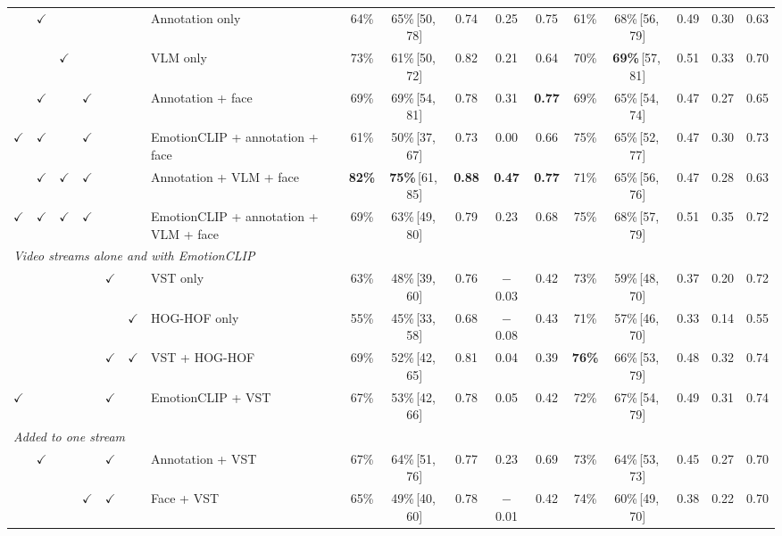 \documentclass[11pt]{article}
\newcommand{\best}[1]{\textbf{#1}}
\newcommand{\ci}[2]{\,[#1,\,#2]}
\begin{document}
\begin{table}[!htbp]
{\begin{tabular}{cccccclcccccccccc}
 & $\checkmark$ &  &  &  &  & Annotation only & 64\% & 65\%\ci{50}{78} & 0.74 & 0.25 & 0.75 & 61\% & 68\%\ci{56}{79} & 0.49 & 0.30 & 0.63 \\
 &  & $\checkmark$ &  &  &  & VLM only & 73\% & 61\%\ci{50}{72} & 0.82 & 0.21 & 0.64 & 70\% & \best{69\%}\ci{57}{81} & 0.51 & 0.33 & 0.70 \\
 & $\checkmark$ &  & $\checkmark$ &  &  & Annotation + face & 69\% & 69\%\ci{54}{81} & 0.78 & 0.31 & \best{0.77} & 69\% & 65\%\ci{54}{74} & 0.47 & 0.27 & 0.65 \\
$\checkmark$ & $\checkmark$ &  & $\checkmark$ &  &  & EmotionCLIP + annotation + face & 61\% & 50\%\ci{37}{67} & 0.73 & 0.00 & 0.66 & 75\% & 65\%\ci{52}{77} & 0.47 & 0.30 & 0.73 \\
 & $\checkmark$ & $\checkmark$ & $\checkmark$ &  &  & Annotation + VLM + face & \best{82\%} & \best{75\%}\ci{61}{85} & \best{0.88} & \best{0.47} & \best{0.77} & 71\% & 65\%\ci{56}{76} & 0.47 & 0.28 & 0.63 \\
$\checkmark$ & $\checkmark$ & $\checkmark$ & $\checkmark$ &  &  & EmotionCLIP + annotation + VLM + face & 69\% & 63\%\ci{49}{80} & 0.79 & 0.23 & 0.68 & 75\% & 68\%\ci{57}{79} & 0.51 & 0.35 & 0.72 \\
\midrule
\multicolumn{17}{l}{\emph{Video streams alone and with EmotionCLIP}} \\
 &  &  &  & $\checkmark$ &  & VST only & 63\% & 48\%\ci{39}{60} & 0.76 & $-$0.03 & 0.42 & 73\% & 59\%\ci{48}{70} & 0.37 & 0.20 & 0.72 \\
 &  &  &  &  & $\checkmark$ & HOG-HOF only & 55\% & 45\%\ci{33}{58} & 0.68 & $-$0.08 & 0.43 & 71\% & 57\%\ci{46}{70} & 0.33 & 0.14 & 0.55 \\
 &  &  &  & $\checkmark$ & $\checkmark$ & VST + HOG-HOF & 69\% & 52\%\ci{42}{65} & 0.81 & 0.04 & 0.39 & \best{76\%} & 66\%\ci{53}{79} & 0.48 & 0.32 & 0.74 \\
$\checkmark$ &  &  &  & $\checkmark$ &  & EmotionCLIP + VST & 67\% & 53\%\ci{42}{66} & 0.78 & 0.05 & 0.42 & 72\% & 67\%\ci{54}{79} & 0.49 & 0.31 & 0.74 \\
\midrule
\multicolumn{17}{l}{\emph{Added to one stream}} \\
 & $\checkmark$ &  &  & $\checkmark$ &  & Annotation + VST & 67\% & 64\%\ci{51}{76} & 0.77 & 0.23 & 0.69 & 73\% & 64\%\ci{53}{73} & 0.45 & 0.27 & 0.70 \\
 &  &  & $\checkmark$ & $\checkmark$ &  & Face + VST & 65\% & 49\%\ci{40}{60} & 0.78 & $-$0.01 & 0.42 & 74\% & 60\%\ci{49}{70} & 0.38 & 0.22 & 0.70 \\

\end{tabular}}
\end{table}
\end{document}

